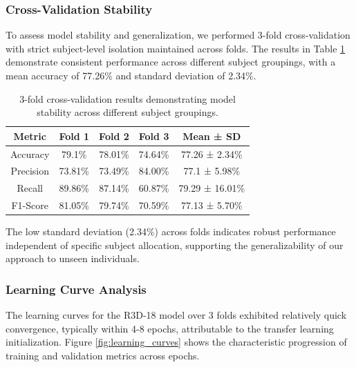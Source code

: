\documentclass[12pt, a4paper]{article}
\begin{document}
\subsubsection{Cross-Validation Stability}

To assess model stability and generalization, we performed 3-fold cross-validation with strict subject-level isolation maintained across folds. The results in Table \ref{tab:cross_validation} demonstrate consistent performance across different subject groupings, with a mean accuracy of 77.26\% and standard deviation of 2.34\%.

\begin{table}[htbp]
\centering
\begin{tabular}{|c|c|c|c|c|}
\hline
\textbf{Metric} & \textbf{Fold 1} & \textbf{Fold 2} & \textbf{Fold 3} & \textbf{Mean ± SD} \\
\hline
Accuracy & 79.1\% & 78.01\% & 74.64\% & 77.26 ± 2.34\% \\
\hline
Precision & 73.81\% & 73.49\% & 84.00\% & 77.1 ± 5.98\% \\
\hline
Recall & 89.86\% & 87.14\% & 60.87\% & 79.29 ± 16.01\% \\
\hline
F1-Score & 81.05\% & 79.74\% & 70.59\% & 77.13 ± 5.70\% \\
\hline
\end{tabular}
\caption{3-fold cross-validation results demonstrating model stability across different subject groupings.}
\label{tab:cross_validation}
\end{table}

The low standard deviation (2.34\%) across folds indicates robust performance independent of specific subject allocation, supporting the generalizability of our approach to unseen individuals.

\subsubsection{Learning Curve Analysis}

The learning curves for the R3D-18 model over 3 folds exhibited relatively quick convergence, typically within 4-8 epochs, attributable to the transfer learning initialization. Figure \ref{fig:learning_curves} shows the characteristic progression of training and validation metrics across epochs.
\end{document}
